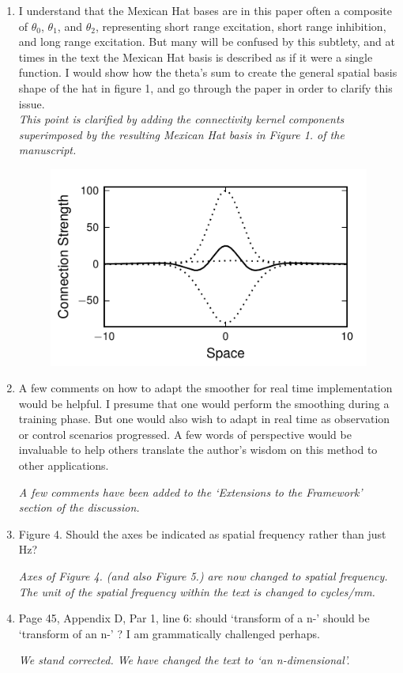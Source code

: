 \documentclass{article}
\begin{document}
\begin{enumerate}
\item I understand that the Mexican Hat bases are in this paper often a composite of $\theta_0$, $\theta_1$, and $\theta_2$, representing short range excitation, short range inhibition, and long range excitation. But many will be confused by this subtlety, and at times in the text the Mexican Hat basis is described as if it were a single function. I would show how the theta's sum to create the general spatial basis shape of the hat in figure 1, and go through the paper in order to clarify this issue.\\

\emph{This point is clarified by adding the connectivity kernel components superimposed by the resulting Mexican Hat basis in Figure 1. of the manuscript.}

 \begin{figure}[!ht]
 \begin{center}
 \includegraphics{./Graph/pdf/fig1.pdf} 
 \end{center}
 \caption{}
 \label{fig:Figure1}
 \end{figure}

\item A few comments on how to adapt the smoother for real time implementation would be helpful. I presume that one would perform the smoothing during a training phase. But one would also wish to adapt in real time as observation or control scenarios progressed. A few words of perspective would be invaluable to help others translate the author's wisdom on this method to other applications.

\emph{A few comments have been added to the `Extensions to the Framework' section of the discussion.}

\item Figure 4. Should the axes be indicated as spatial frequency rather than just Hz?

\emph{Axes of Figure 4. (and also Figure 5.) are now changed to spatial frequency. The unit of the spatial frequency within the text is changed to cycles/mm.}

\item Page 45, Appendix D, Par 1, line 6: should `transform of a n-' should be `transform of an n-' ? I am grammatically challenged perhaps.

\emph{We stand corrected. We have changed the text to `an n-dimensional'.}

\end{enumerate}
\end{document}
